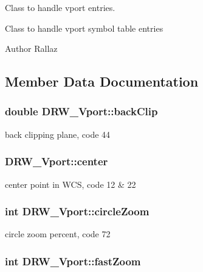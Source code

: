 Class to handle vport entries. 

Class to handle vport symbol table entries \begin{DoxyAuthor}{Author}
Rallaz 
\end{DoxyAuthor}


\subsection{Member Data Documentation}
\hypertarget{classDRW__Vport_a160e2ab229be33a622e4f888eb4295c7}{
\subsubsection[{back\-Clip}]{\setlength{\rightskip}{0pt plus 5cm}double D\-R\-W\-\_\-\-Vport\-::back\-Clip}}\label{classDRW__Vport_a160e2ab229be33a622e4f888eb4295c7}
back clipping plane, code 44 \hypertarget{classDRW__Vport_a56104afc60b9fb0b8c6682982f92a45e}{
\subsubsection[{center}]{ D\-R\-W\-\_\-\-Vport\-::center}}\label{classDRW__Vport_a56104afc60b9fb0b8c6682982f92a45e}
center point in W\-C\-S, code 12 \& 22 \hypertarget{classDRW__Vport_afdff3db96e16473300e9c2d50b464267}{
\subsubsection[{circle\-Zoom}]{\setlength{\rightskip}{0pt plus 5cm}int D\-R\-W\-\_\-\-Vport\-::circle\-Zoom}}\label{classDRW__Vport_afdff3db96e16473300e9c2d50b464267}
circle zoom percent, code 72 \hypertarget{classDRW__Vport_a2e8e4ad00361daa81e7cdcd3ffc51d4f}{
\subsubsection[{fast\-Zoom}]{\setlength{\rightskip}{0pt plus 5cm}int D\-R\-W\-\_\-\-Vport\-::fast\-Zoom}}\label{classDRW__Vport_a2e8e4ad00361daa81e7cdcd3ffc51d4f}
